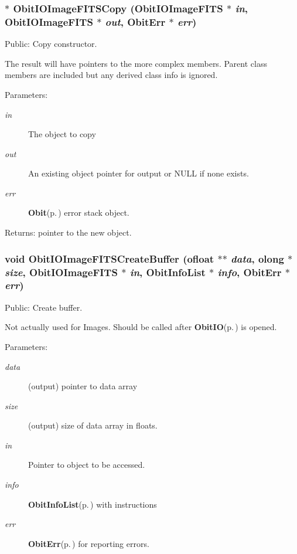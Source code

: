\subsubsection{$\ast$ Obit\-IOImage\-FITSCopy ({\bf Obit\-IOImage\-FITS} $\ast$ {\em in}, {\bf Obit\-IOImage\-FITS} $\ast$ {\em out}, {\bf Obit\-Err} $\ast$ {\em err})}\label{ObitIOImageFITS_8c_a24}


Public: Copy constructor. 

The result will have pointers to the more complex members. Parent class members are included but any derived class info is ignored. \begin{Desc}
\item[Parameters:]
\begin{description}
\item[{\em in}]The object to copy \item[{\em out}]An existing object pointer for output or NULL if none exists. \item[{\em err}]{\bf Obit}{\rm (p.\,\pageref{structObit})} error stack object. \end{description}
\end{Desc}
\begin{Desc}
\item[Returns:]pointer to the new object. \end{Desc}
\subsubsection{\setlength{\rightskip}{0pt plus 5cm}void Obit\-IOImage\-FITSCreate\-Buffer ({\bf ofloat} $\ast$$\ast$ {\em data}, {\bf olong} $\ast$ {\em size}, {\bf Obit\-IOImage\-FITS} $\ast$ {\em in}, {\bf Obit\-Info\-List} $\ast$ {\em info}, {\bf Obit\-Err} $\ast$ {\em err})}\label{ObitIOImageFITS_8c_a33}


Public: Create buffer. 

Not actually used for Images. Should be called after {\bf Obit\-IO}{\rm (p.\,\pageref{structObitIO})} is opened. \begin{Desc}
\item[Parameters:]
\begin{description}
\item[{\em data}](output) pointer to data array \item[{\em size}](output) size of data array in floats. \item[{\em in}]Pointer to object to be accessed. \item[{\em info}]{\bf Obit\-Info\-List}{\rm (p.\,\pageref{structObitInfoList})} with instructions \item[{\em err}]{\bf Obit\-Err}{\rm (p.\,\pageref{structObitErr})} for reporting errors. \end{description}
\end{Desc}
